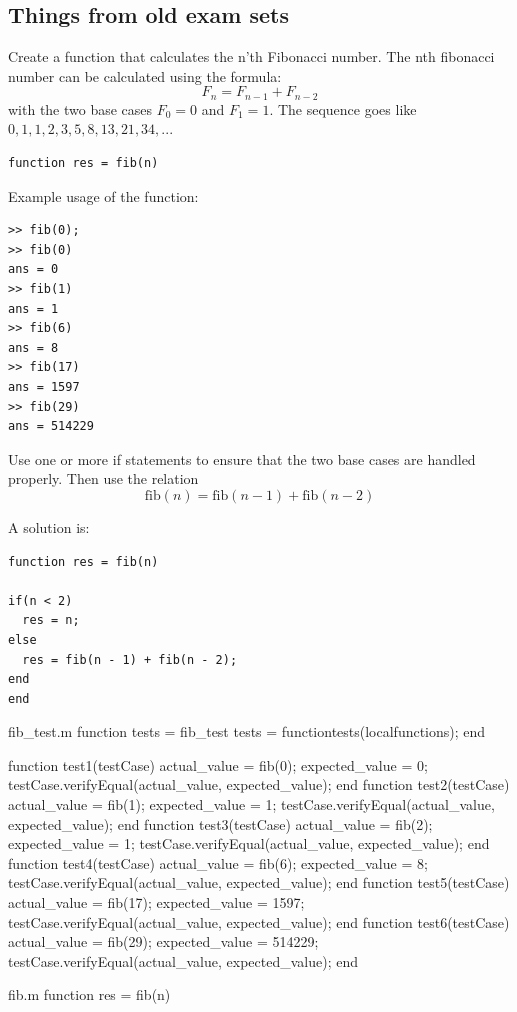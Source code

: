 \subsection{Things from old exam sets}

\begin{ex}
Create a function that calculates the n'th Fibonacci number. The nth
fibonacci number can be calculated using the formula: 
\[
F_n = F_{n-1} + F_{n-2}
\]
with the two base cases $F_0 = 0$ and $F_1 = 1$. The sequence goes like
$0, 1, 1, 2, 3, 5, 8, 13, 21, 34, ...$
\begin{lstlisting}
function res = fib(n)
\end{lstlisting}
Example usage of the function:
\begin{lstlisting}
>> fib(0);
>> fib(0)
ans = 0
>> fib(1)
ans = 1
>> fib(6)
ans = 8
>> fib(17)
ans = 1597
>> fib(29)
ans = 514229
\end{lstlisting}
\begin{hint}
Use one or more if statements to ensure that the two base
cases are handled properly.
Then use the relation
\[
\textrm{fib}(n) = \textrm{fib}(n - 1) + \textrm{fib}(n - 2)
\]
\end{hint}
\begin{sol}
A solution is:
\begin{lstlisting}
function res = fib(n)

if(n < 2)
  res = n;
else
  res = fib(n - 1) + fib(n - 2);
end
end
\end{lstlisting}
\end{sol}
\begin{solutionfile}{fib_test.m}
function tests = fib_test
    tests = functiontests(localfunctions);
end



function test1(testCase)
    actual_value = fib(0);
    expected_value = 0;
    testCase.verifyEqual(actual_value, expected_value);
end
function test2(testCase)
    actual_value = fib(1);
    expected_value = 1;
    testCase.verifyEqual(actual_value, expected_value);
end
function test3(testCase)
    actual_value = fib(2);
    expected_value = 1;
    testCase.verifyEqual(actual_value, expected_value);
end
function test4(testCase)
    actual_value = fib(6);
    expected_value = 8;
    testCase.verifyEqual(actual_value, expected_value);
end
function test5(testCase)
    actual_value = fib(17);
    expected_value = 1597;
    testCase.verifyEqual(actual_value, expected_value);
end
function test6(testCase)
    actual_value = fib(29);
    expected_value = 514229;
    testCase.verifyEqual(actual_value, expected_value);
end
\end{solutionfile}
\begin{solutionfile}{fib.m}
function res = fib(n)


\end{solutionfile}
\end{ex}
